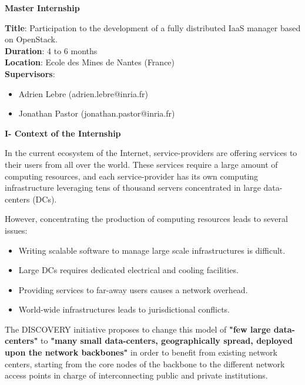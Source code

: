 \documentclass{letter}
\begin{document}
\address{B216 - Ecole des Mines de Nantes\\
4, rue Alfred Kastler, BP 20722\\
44307 Nantes Cedex 3,\\
France}


\begin{letter}
{\Large \textbf{Master Internship}}


\date{01 March 2015}

\opening{}

{\textbf{Title}: Participation to the development of a fully distributed
 IaaS manager based on OpenStack.\\
\textbf{Duration}: 4 to 6 months\\
\textbf{Location}: Ecole des Mines de Nantes (France)\\
\textbf{Supervisors}: \begin{itemize}
\item Adrien Lebre (adrien.lebre@inria.fr)
\item Jonathan Pastor (jonathan.pastor@inria.fr)
\end{itemize}
}

{\Large \textbf{I- Context of the Internship}}

In the current ecosystem of the Internet, service-providers are offering services
to their users from all over the world. These services require
a large amount of computing resources, and each service-provider has its own computing
infrastructure leveraging tens of thousand servers concentrated in large 
data-centers (DCs). 

However, concentrating the production of computing resources leads to several 
issues:

\begin{itemize}
\item  Writing scalable software to manage large scale infrastructures is
difficult.
\item Large DCs requires dedicated electrical and cooling facilities.
\item Providing services to far-away users causes a network overhead.
\item World-wide infrastructures leads to jurisdictional conflicts.
\end{itemize}

The DISCOVERY initiative proposes to change this model of \textbf{"few large 
data-centers"} to \textbf{"many small data-centers, geographically spread, deployed upon 
the network backbones"} in order to benefit from existing network centers, starting from the 
core nodes of the backbone to the different network access points in charge of 
interconnecting public and private institutions. 


\end{letter}
\end{document}
